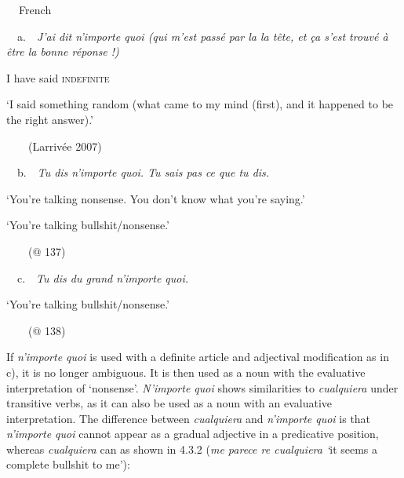 \begin{styleStandard}
\label{bkm:Ref62641804}\textbf{\ \ }French
\end{styleStandard}

\begin{styleStandard}
\ \ a.\ \ \textit{J’ai dit n’importe quoi (qui m’est passé par la la tête, et ça s’est trouvé à être la bonne réponse !)} 
\end{styleStandard}

\begin{styleStandard}
I have said \textsc{indefinite}
\end{styleStandard}

\begin{styleStandard}
‘I said something random (what came to my mind (first), and it happened to be the right answer).’
\end{styleStandard}

\begin{styleStandard}
\ \ \ \ (Larrivée 2007)
\end{styleStandard}

\begin{styleStandard}
\ \ b.\ \ \textit{Tu dis n’importe quoi. Tu sais pas ce que tu dis.}
\end{styleStandard}

\begin{styleStandard}
‘You’re talking nonsense. You don’t know what you’re saying.’
\end{styleStandard}

\begin{styleStandard}
‘You’re talking bullshit/nonsense.’
\end{styleStandard}

\begin{styleStandard}
\ \ \ \ (@ 137)
\end{styleStandard}

\begin{styleStandard}
\ \ c.\ \ \textit{Tu dis du grand n’importe quoi.}
\end{styleStandard}

\begin{styleStandard}
‘You’re talking bullshit/nonsense.’
\end{styleStandard}

\begin{styleStandard}
\ \ \ \ (@ 138)
\end{styleStandard}

\begin{styleStandard}
If \textit{n’importe quoi} is used with a definite article and adjectival modification as in c), it is no longer ambiguous. It is then used as a noun with the evaluative interpretation of ‘nonsense’. \textit{N’importe quoi} shows similarities to \textit{cualquiera} under transitive verbs, as it can also be used as a noun with an evaluative interpretation. The difference between \textit{cualquiera} and \textit{n’importe quoi} is that \textit{n’importe quoi} cannot appear as a gradual adjective in a predicative position, whereas \textit{cualquiera} can as shown in 4.3.2 (\textit{me parece re cualquiera ‘}it seems a complete bullshit to me’):
\end{styleStandard}

